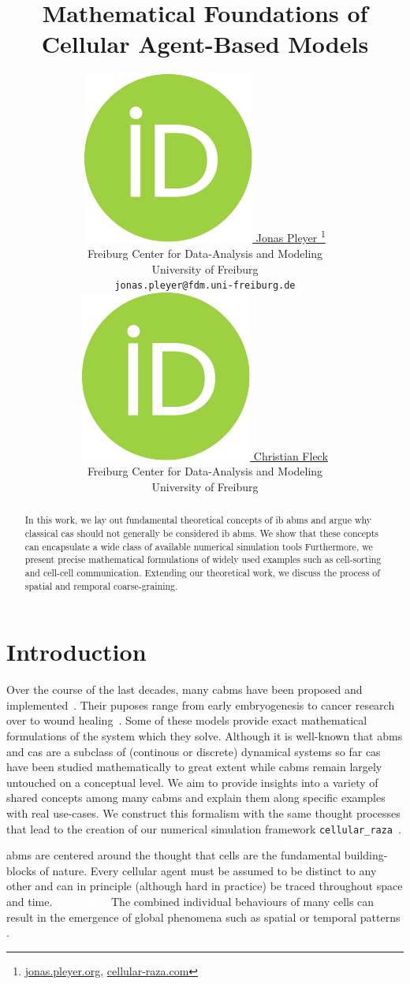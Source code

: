 \documentclass{article}
\title{
    Mathematical Foundations of\\
    Cellular Agent-Based Models
}
\author{
    \href{https://orcid.org/0009-0001-0613-7978}{
        \includegraphics[scale=0.06]{orcid.pdf}
        \hspace{1mm}Jonas Pleyer
    }
    \thanks{
        \href{https://jonas.pleyer.org}{jonas.pleyer.org},
        \href{https://cellular-raza.com}{cellular-raza.com}
    }\\
	Freiburg Center for Data-Analysis and Modeling\\
	University of Freiburg\\
	\texttt{jonas.pleyer@fdm.uni-freiburg.de} \\
	\And
	\href{https://orcid.org/0000-0002-6371-4495}{
        \includegraphics[scale=0.06]{orcid.pdf}
        \hspace{1mm}Christian Fleck
    }\\
	Freiburg Center for Data-Analysis and Modeling\\
	University of Freiburg
}
\newcommand{\todo}[1]{\colorbox{WildStrawberry}{\textcolor{white}{#1}}}
\begin{document}
\maketitle

\begin{abstract}
    In this work, we lay out fundamental theoretical concepts of \ac{ib} \acp{abm} and argue why
    classical \acp{ca} should not generally be considered \ac{ib} \acp{abm}.
    We show that these concepts can encapsulate a wide class of available numerical simulation tools
    Furthermore, we present precise mathematical formulations of widely used examples such as
    cell-sorting and cell-cell communication.
    Extending our theoretical work, we discuss the process of spatial and remporal coarse-graining.
\end{abstract}


\section{Introduction}
Over the course of the last decades, many \acp{cabm} have been proposed and
implemented~\cite{Pleyer2023}.
Their puposes range from early embryogenesis to cancer research over to wound
healing~\cite{Ziraldo2013}.
Some of these models provide exact mathematical formulations \cite{Ghaffarizadeh2018,Tanaka2015} of
the system which they solve.
Although it is well-known that \acp{abm} and \acp{ca} are a subclass of (continous or discrete)
dynamical systems \cite{Wolfram1984} so far \acp{ca} have been studied mathematically to great
extent while \acp{cabm} remain largely untouched on a conceptual level.
We aim to provide insights into a variety of shared concepts among many \acp{cabm} and explain them
along specific examples with real use-cases.
We construct this formalism with the same thought processes that lead to the creation of our
numerical simulation framework \lstinline{cellular_raza}~\cite{Pleyer_cellular_raza_2024}.

\acp{abm} are centered around the thought that cells are the fundamental building-blocks of nature.
Every cellular agent must be assumed to be distinct to any other and can in principle (although hard
in practice) be traced throughout space and time.\todo{CITATION}
The combined individual behaviours of many cells can result in the emergence of global phenomena
such as spatial or temporal patterns \cite{Owen2020,Wolpert1969,Giudicelli2007}.
\end{document}
